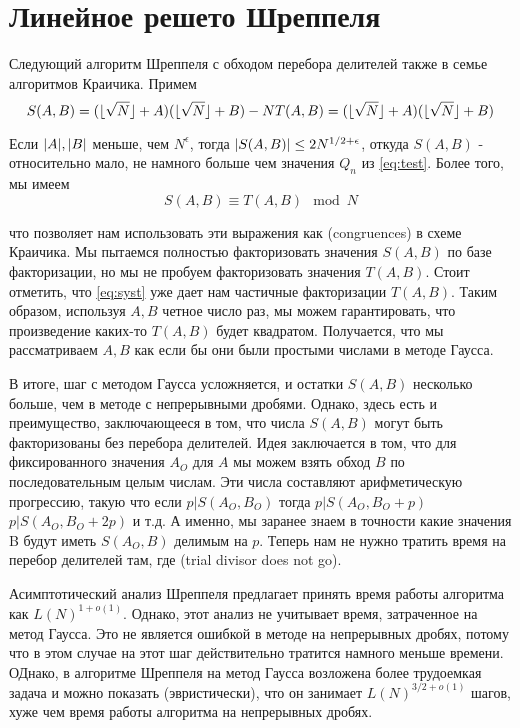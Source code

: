 \documentclass[russian, utf8, a4paper,12pt]{report}
\DeclarePairedDelimiter\floor{\lfloor}{\rfloor}
\DeclarePairedDelimiter\abs{\lvert}{\rvert}%
\begin{document}
\section{Линейное решето Шреппеля}
Следующий алгоритм Шреппеля с обходом перебора делителей также в семье алгоритмов Краичика. Примем
\begin{equation}\label{eq:syst}
S(A,B) = (\floor{\sqrt{N}} + A)(\floor{\sqrt{N}} + B) -N\\
T(A,B) = (\floor{\sqrt{N}} + A)(\floor{\sqrt{N}} + B)
\end{equation}

Если $\abs{A}, \abs{B}$ меньше, чем $N^{\epsilon}$, тогда $\abs{S(A,B)} \leq 2N^{1/2 + \epsilon}$, откуда $S(A,B)$ - относительно мало, не намного больше чем значения $Q_n$ из \eqref{eq:test}. Более того, мы имеем
\begin{equation*}
S(A,B) \equiv T(A,B) \mod N
\end{equation*}

что позволяет нам использовать эти выражения как (congruences) в схеме Краичика. Мы пытаемся полностью факторизовать значения $S(A,B)$ по базе факторизации, но мы не пробуем факторизовать значения $T(A,B)$. Стоит отметить, что \eqref{eq:syst} уже дает нам частичные факторизации $T(A,B)$. Таким образом, используя $A, B$ четное число раз, мы можем гарантировать, что произведение каких-то $T(A,B)$ будет квадратом. Получается, что мы рассматриваем $A, B$ как если бы они были простыми числами в методе Гаусса.

В итоге, шаг с методом Гаусса усложняется, и остатки $S(A, B)$ несколько больше, чем в методе с непрерывными дробями. Однако, здесь есть и преимущество, заключающееся в том, что числа $S(A,B)$ могут быть факторизованы без перебора делителей. Идея заключается в том, что для фиксированного значения $A_O$ для $A$ мы можем взять обход $B$ по последовательным целым числам. Эти числа составляют арифметическую прогрессию, такую что если $p|S(A_O, B_O)$ тогда $p|S(A_O, B_O + p)$ $p|S(A_O, B_O + 2p)$ и т.д. А именно, мы заранее знаем в точности какие значения B будут иметь $S(A_O, B)$ делимым на $p$. Теперь нам не нужно тратить время на перебор делителей там, где (trial divisor does not go).

Асимптотический анализ Шреппеля предлагает принять время работы алгоритма как $L(N)^{1+o(1)}$. Однако, этот анализ не учитывает время, затраченное на метод Гаусса. Это не является ошибкой в методе на непрерывных дробях, потому что в этом случае на этот шаг действительно тратится намного меньше времени. ОДнако, в алгоритме Шреппеля на метод Гаусса возложена более трудоемкая задача и можно показать (эвристически), что он занимает $L(N)^{3/2 +o(1)}$ шагов, хуже чем время работы алгоритма на непрерывных дробях.
\end{document}
